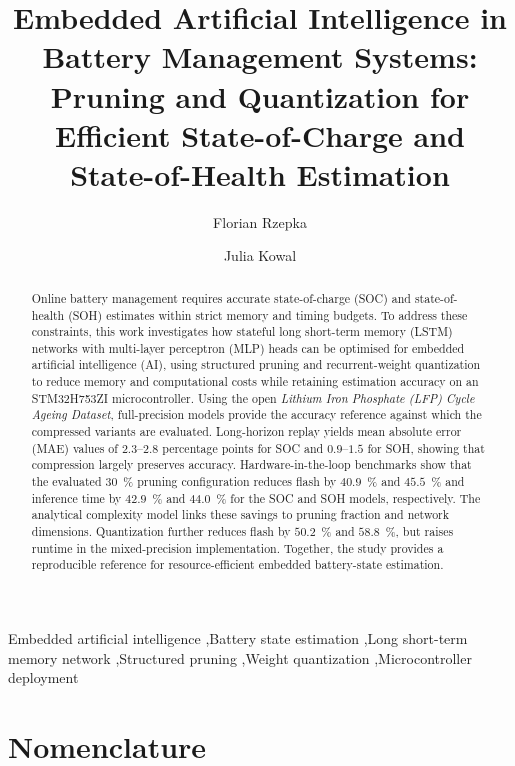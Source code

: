 \documentclass[final,3p,times]{elsarticle}
\date{}
\begin{document}
\begin{frontmatter}
\title{Embedded Artificial Intelligence in Battery Management Systems: Pruning and Quantization for Efficient State-of-Charge and State-of-Health Estimation}
\author[tu]{Florian Rzepka}
\author[tu]{Julia Kowal}
\begin{abstract}
Online battery management requires accurate state-of-charge (SOC) and state-of-health (SOH) estimates within strict memory and timing budgets. To address these constraints, this work investigates how stateful long short-term memory (LSTM) networks with multi-layer perceptron (MLP) heads can be optimised for embedded artificial intelligence (AI), using structured pruning and recurrent-weight quantization to reduce memory and computational costs while retaining estimation accuracy on an STM32H753ZI microcontroller. Using the open \emph{Lithium Iron Phosphate (LFP) Cycle Ageing Dataset}, full-precision models provide the accuracy reference against which the compressed variants are evaluated. Long-horizon replay yields mean absolute error (MAE) values of $2.3$--$2.8$ percentage points for SOC and $0.9$--$1.5$ for SOH, showing that compression largely preserves accuracy. Hardware-in-the-loop benchmarks show that the evaluated 30~\% pruning configuration reduces flash by $40.9$~\% and $45.5$~\% and inference time by $42.9$~\% and $44.0$~\% for the SOC and SOH models, respectively. The analytical complexity model links these savings to pruning fraction and network dimensions. Quantization further reduces flash by $50.2$~\% and $58.8$~\%, but raises runtime in the mixed-precision implementation. Together, the study provides a reproducible reference for resource-efficient embedded battery-state estimation.
\end{abstract}
\begin{keyword}
Embedded artificial intelligence \sep Battery state estimation \sep Long short-term memory network \sep Structured pruning \sep Weight quantization \sep Microcontroller deployment
\end{keyword}
\end{frontmatter}
\section*{Nomenclature}
\small
\end{document}
